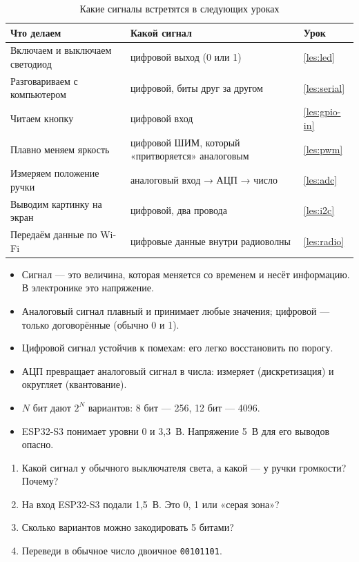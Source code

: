 \begin{table}[H]
\centering\small
\begin{tabularx}{\textwidth}{@{}l X l@{}}
\toprule
Что делаем & Какой сигнал & Урок\\
\midrule
Включаем и выключаем светодиод & цифровой выход (0 или 1) & \ref{les:led}\\
Разговариваем с компьютером & цифровой, биты друг за другом & \ref{les:serial}\\
Читаем кнопку & цифровой вход & \ref{les:gpio-in}\\
Плавно меняем яркость & цифровой ШИМ, который «притворяется» аналоговым & \ref{les:pwm}\\
Измеряем положение ручки & аналоговый вход → АЦП → число & \ref{les:adc}\\
Выводим картинку на экран & цифровой, два провода & \ref{les:i2c}\\
Передаём данные по Wi-Fi & цифровые данные внутри радиоволны & \ref{les:radio}\\
\bottomrule
\end{tabularx}
\caption{Какие сигналы встретятся в следующих уроках}
\end{table}

\begin{summary}
\begin{itemize}[leftmargin=*]
  \item Сигнал --- это величина, которая меняется со временем и несёт информацию. В электронике это напряжение.
  \item Аналоговый сигнал плавный и принимает любые значения; цифровой --- только договорённые (обычно 0 и 1).
  \item Цифровой сигнал устойчив к помехам: его легко восстановить по порогу.
  \item АЦП превращает аналоговый сигнал в числа: измеряет (дискретизация) и округляет (квантование).
  \item $N$ бит дают $2^N$ вариантов: 8 бит --- 256, 12 бит --- 4096.
  \item ESP32-S3 понимает уровни 0 и 3,3~В. Напряжение 5~В для его выводов опасно.
\end{itemize}
\end{summary}

\begin{selfcheck}
\begin{enumerate}
  \item Какой сигнал у обычного выключателя света, а какой --- у ручки громкости? Почему?
  \item На вход ESP32-S3 подали 1,5~В. Это 0, 1 или «серая зона»?
  \item Сколько вариантов можно закодировать 5 битами?
  \item Переведи в обычное число двоичное \texttt{00101101}.
\end{enumerate}
\end{selfcheck}

